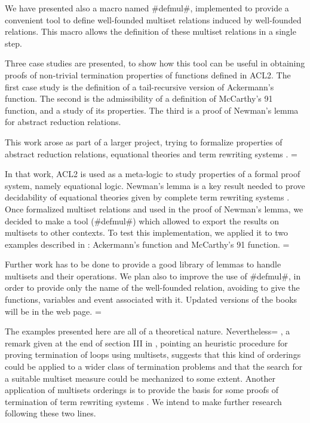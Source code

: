 \documentclass[11pt]{llncs}
\begin{document}
{We have presented also a macro named #defmul#, implemented to provide
a convenient tool to define well-founded multiset relations induced by
well-founded relations. This macro allows the definition of these
multiset relations in a single step.

Three case studies are presented, to show how this tool can be useful in
obtaining proofs of non-trivial termination properties of functions
defined in ACL2. The first case study is the definition of a
tail-recursive version of Ackermann's function. The second is the
admissibility of a definition of McCarthy's 91 function, and a study of
its properties. The third is a proof of Newman's lemma for abstract
reduction relations.

This work arose as part of a larger project, trying to formalize
properties of abstract reduction relations, equational theories and
term rewriting systems \cite{RRweb,RR2}. =

 In that work, ACL2 is used as a
meta-logic to study properties of a formal proof system, namely
equational logic. Newman's lemma is a key result needed to prove
decidability of equational theories given by complete term rewriting
systems \cite{Nipkow}. Once formalized multiset relations and used in
the proof of Newman's lemma, we decided to make a tool (#defmul#) which
allowed to export the results on multisets to other contexts. To test
this implementation, we applied it to two examples described in
\cite{DM-multiset}: Ackermann's function and McCarthy's 91 function.   =


Further work has to be done to provide a good library of lemmas to
handle multisets and their operations. We plan also to
improve the use of #defmul#, in order to provide  only the name of the
well-founded relation, avoiding to give the functions, variables and
event associated with it. Updated versions of the books will be in the
web page. =


The examples presented here are all of a theoretical nature. Nevertheless=
, a
remark given at the end of section III in \cite{DM-multiset}, pointing
an heuristic procedure for proving termination of loops using multisets,
suggests that this kind of orderings could be applied to a wider class
of termination problems and that the search for a suitable multiset
measure could be mechanized to some extent. Another application of
multisets orderings is to provide the basis for some proofs of
termination of term rewriting systems \cite{Nipkow}. We intend to make
further research following these two lines.


}
\end{document}
